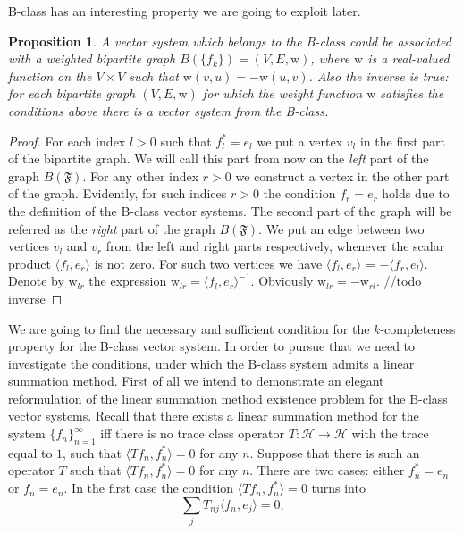 \documentclass[12pt]{article}
\newcommand\inner[2]{\langle #1, #2 \rangle}
\renewcommand{\cal}[1]{\mathcal{#1}}
\newtheorem{prop}{Proposition}
\theoremstyle{definition}
\newcommand{\seq}[1]{\{{#1}_n\}_{n=1}^\infty}
\newcommand{\fsys}{\mathfrak{F}}
\newcommand{\wt}{\mathrm{w}}
\numberwithin{remark}{section}
\numberwithin{theorem}{section}
\numberwithin{prop}{section}
\numberwithin{equation}{section}
\numberwithin{lemma}{section}
\numberwithin{prop_under_lemma}{lemma}
\begin{document}
    B-class has an interesting property we are going to exploit later.
    \begin{prop}
        A vector system which belongs to the B-class could be associated with a
        weighted bipartite graph $B(\{f_k\}) = (V, E, \wt)$, where $\wt$ is a
        real-valued function on the $V\times V$ such that $\wt(v, u) = -\wt(u, v)$.
        Also the inverse is true: for each bipartite graph $(V, E, \wt)$ for which the weight function
        $\wt$ satisfies the conditions above there is a vector system from the B-class.
    \end{prop}
    \begin{proof}
        For each index $l > 0$ such that $f^*_l = e_l$ we put a vertex $v_l$ in the first part of the bipartite graph.
        We will call this part from now on the \textit{left} part of the graph $B(\fsys)$.
        For any other index $r > 0$ we construct a vertex in the other part of the graph.
        Evidently, for such indices $r > 0$ the condition $f_r = e_r$ holds due to the definition of the B-class vector systems.
        The second part of the graph will be referred as the \textit{right} part of the graph $B(\fsys)$.
        We put an edge between two vertices $v_l$ and $v_r$ from the left and right parts respectively,
        whenever the scalar product $\inner{f_l}{e_r}$ is not zero.
        For such two vertices we have $\inner{f_l}{e_r}$ = $-\inner{f_r}{e_l}$.
        Denote by $\wt_{lr}$ the expression $\wt_{lr} = \inner{f_l}{e_r}^{-1}$.
        Obviously $\wt_{lr} = -\wt_{rl}$.
        //todo inverse
    \end{proof}
    We are going to find the necessary and sufficient condition for the $k$-completeness property for the B-class vector system.
    In order to pursue that we need to investigate the conditions, under which the B-class system admits a linear summation method.
    First of all we intend to demonstrate an elegant reformulation of the linear summation method existence problem for
      the B-class vector systems.
    Recall that there exists a linear summation method for the system $\seq{f}$
      iff there is no trace class operator $T: \cal{H} \to \cal{H}$ with the trace equal to $1$,
      such that $\inner{Tf_n}{f_n^*} = 0$ for any $n$.
    Suppose that there is such an operator $T$ such that $\inner{Tf_n}{f_n^*} = 0$ for any $n$.
    There are two cases: either $f^*_n = e_n$ or $f_n = e_n$.
    In the first case the condition $\inner{Tf_n}{f_n^*} = 0$ turns into
    \begin{equation}
        \label{left-eqn}
        \sum_j T_{nj} \inner{f_n}{e_j} = 0,
    \end{equation}
\end{document}

